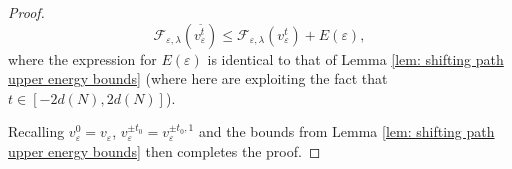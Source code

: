\documentclass[10pt,a4paper]{amsart}
\begin{document}
\begin{proof}
\begin{equation*}
    \mathcal{F}_{\varepsilon,\lambda}(v^{\tilde{t}}_\varepsilon) \leq \mathcal{F}_{\varepsilon,\lambda}(v^t_\varepsilon) + E(\varepsilon),
\end{equation*}
where the expression for $E(\varepsilon)$ is identical to that of Lemma \ref{lem: shifting path upper energy bounds} (where here are exploiting the fact that $t \in [-2d(N),2d(N)]$).

\bigskip

Recalling $v^0_\varepsilon = v_\varepsilon$, $v^{\pm t_0}_\varepsilon = v^{\pm t_0, 1}_\varepsilon$ and the bounds from Lemma \ref{lem: shifting path upper energy bounds} then completes the proof.
\end{proof}
\end{document}
